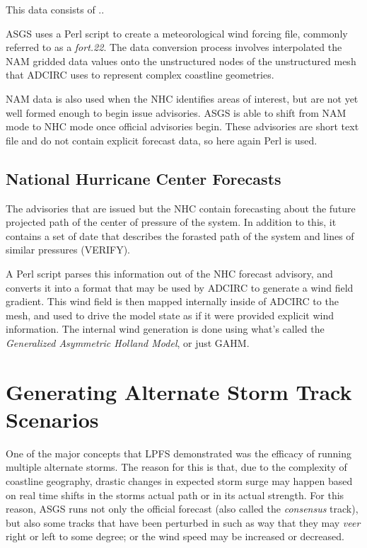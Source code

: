 \documentclass{article}
\begin{document}
This data consists of ..

ASGS uses a Perl script to create a meteorological wind forcing file, commonly
referred to as a \textit{fort.22}. The data conversion process involves
interpolated the NAM gridded data values onto the unstructured nodes of the
unstructured mesh that ADCIRC uses to represent complex coastline geometries.

NAM data is also used when the NHC identifies areas of interest, but are not yet
well formed enough to begin issue advisories. ASGS is able to shift from NAM mode
to NHC mode once official advisories begin. These advisories are short text file
and do not contain explicit forecast data, so here again Perl is used.

\subsection{National Hurricane Center Forecasts}

The advisories that are issued but the NHC contain forecasting about the future
projected path of the center of pressure of the system. In addition to this, it
contains a set of date that describes the forasted path of the system and lines
of similar pressures (VERIFY).

A Perl script parses this information out of the NHC forecast advisory, and converts
it into a format that may be used by ADCIRC to generate a wind field gradient.
This wind field is then mapped internally inside of ADCIRC to the mesh, and used
to drive the model state as if it were provided explicit wind information. The
internal wind generation is done using what's called the \textit{Generalized Asymmetric
Holland Model}, or just GAHM.

\section{Generating Alternate Storm Track Scenarios}

One of the major concepts that LPFS demonstrated was the efficacy of running multiple
alternate storms. The reason for this is that, due to the complexity of coastline
geography, drastic changes in expected storm surge may happen based on real time
shifts in the storms actual path or in its actual strength. For this reason, ASGS
runs not only the official forecast (also called the \textit{consensus} track), but
also some tracks that have been perturbed in such as way that they may \textit{veer}
right or left to some degree; or the wind speed may be increased or decreased.
\end{document}
